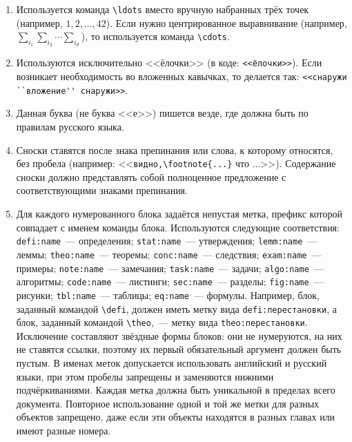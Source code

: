 \begin{enumerate}
    \item {}
        Используется команда \verb|\ldots| вместо вручную набранных трёх точек (например, $1, 2, \ldots, 42$).
        Если нужно центрированное выравнивание (например, $\sum_{i_1} \sum_{i_2} \cdots \sum_{i_d}$), то используется команда \verb|\cdots|.

    \item {}
        Используются исключительно <<ёлочки>> (в коде: \verb|<<ёлочки>>|).
        Если возникает необходимость во вложенных кавычках, то делается так: \verb|<<снаружи ``вложение'' снаружи>>|.

    \item {}
        Данная буква (не буква <<е>>) пишется везде, где должна быть по правилам русского языка.

    \item {}
        Сноски ставятся после знака препинания или слова, к которому относятся, без пробела (например: <<\verb|видно,\footnote{...}| что ...>>).
        Содержание сноски должно представлять собой полноценное предложение с соответствующими знаками препинания.

    \item {}
        Для каждого нумерованного блока задаётся непустая метка, префикс которой совпадает с именем команды блока.
        Используются следующие соответствия:
        \verb|defi:name|~--- определения;
        \verb|stat:name|~---  утверждения;
        \verb|lemm:name|~---  леммы;
        \verb|theo:name|~---  теоремы;
        \verb|conc:name|~---  следствия;
        \verb|exam:name|~---  примеры;
        \verb|note:name|~---  замечания;
        \verb|task:name|~--- задачи;
        \verb|algo:name|~---  алгоритмы;
        \verb|code:name|~---  листинги;
        \verb|sec:name|~---  разделы;
        \verb|fig:name|~---  рисунки;
        \verb|tbl:name|~---  таблицы;
        \verb|eq:name|~---  формулы.
        Например, блок, заданный командой \verb|\defi|, должен иметь метку вида \verb|defi:перестановки|, а блок, заданный командой \verb|\theo|,~--- метку вида \verb|theo:перестановки|.
        Исключение составляют звёздные формы блоков: они не нумеруются, на них не ставятся ссылки, поэтому их первый обязательный аргумент должен быть пустым.
        В именах меток допускается использовать английский и русский языки, при этом пробелы запрещены и заменяются нижними подчёркиваниями.
        Каждая метка должна быть уникальной в пределах всего документа.
        Повторное использование одной и той же метки для разных объектов запрещено, даже если эти объекты находятся в разных главах или имеют разные номера.


\end{enumerate}
